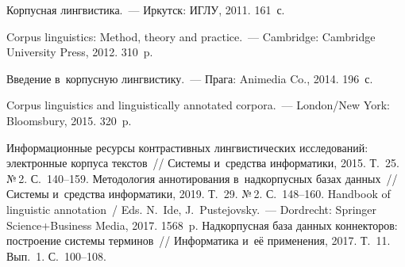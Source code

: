 \begin{multicols}{2}
{\small\frenchspacing
 {%
 \begin{thebibliography}{99}
 
 Корпусная лингвистика.~--- Иркутск: ИГЛУ, 2011. 161~с.
  
  Corpus linguistics: Method, theory and practice.~--- Cambridge: 
Cambridge University Press, 2012. 310~p.

 Введение в~корпусную лингвистику.~--- Прага: Animedia Co., 2014. 196~с.

 Corpus linguistics and linguistically annotated 
corpora.~--- London/New York: Bloomsbury, 2015. 320~p.

 Информационные ресурсы контрастивных лингвистических 
исследований: электронные корпуса текстов~// Системы и~средства информатики, 2015. 
Т.~25. №\,2. С.~140--159.
 Методология аннотирования 
в~надкорпусных базах данных~// Системы и~средства информатики, 2019. Т.~29. №\,2. 
С.~148--160.
Handbook of linguistic annotation~/ Eds. N.~Ide, J.~Pustejovsky.~--- Dordrecht: Springer 
Science\;+\;Business Media, 2017. 1568~p.
 Надкорпусная база данных 
коннекторов: построение системы терминов~// Информатика и~её применения, 2017. 
Т.~11. Вып.~1. С.~100--108.


\end{thebibliography}}}
\end{multicols}
